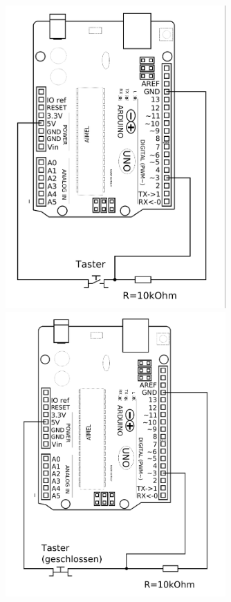 \documentclass[ngerman, 11pt]{scrreprt}
\begin{document}
	\begin{figure}[H]
		\hfill
		\begin{minipage}{0.4\textwidth}
			\includegraphics[width=0.75\textwidth]{../Zeichnungen/taster-an-arduino.png}
		\end{minipage}
		\hfill
		\begin{minipage}{0.4\textwidth}
			\includegraphics[width=0.75\textwidth]{../Zeichnungen/taster-an-arduino-geschlossen.png}
		\end{minipage}
		\hfill
		\label{abb:schaltplan-taster-pulldown}
	\end{figure}
	
\end{document}
